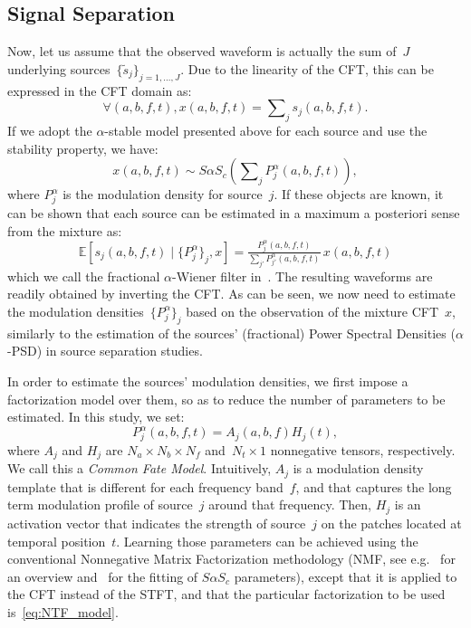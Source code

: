 \subsection{Signal Separation}

Now, let us assume that the observed waveform is actually the sum
of~$J$ underlying sources~$\{ \tilde{s}_{j}\} _{j=1,\dots,J}$.
Due to the linearity of the CFT, this can be
expressed in the CFT domain as:
$$
\forall\left(a,b,f,t\right),x\left(a,b,f,t\right)=\sum\nolimits_{j}s_{j}\left(a,b,f,t\right).
$$
If we adopt the $\alpha$-stable model presented above for each source
and use the stability property, we have:
$$
x\left(a,b,f,t\right)\sim S\alpha S_{c}\left(\sum\nolimits_{j}P_{j}^{\alpha}\left(a,b,f,t\right)\right),
$$
where $P_{j}^{\alpha}$ is the modulation density for source~$j$.
If these objects are known, it can be shown that each source can be
estimated in a maximum a posteriori sense from the mixture as:
\begin{equation}
\mathbb{E}\left[s_{j}\left(a,b,f,t\right)\mid \{ P_{j}^{\alpha}\} _{j},x\right]=\tfrac{P_{j}^{\alpha}\left(a,b,f,t\right)}{\sum_{j'}P_{j'}^{\alpha}\left(a,b,f,t\right)} \, x\left(a,b,f,t\right)\label{eq:alpha_wiener}
\end{equation}
which we call the fractional $\alpha$-Wiener filter in~\cite{alpha-wiener}.
The resulting waveforms are readily obtained by inverting the CFT.\@
As can be seen, we now need to estimate the modulation
densities~$\{ P_{j}^{\alpha}\} _{j}$ based on the observation
of the mixture CFT~$x$, similarly to the estimation of
 the sources' (fractional) Power Spectral Densities ($\alpha$-PSD)
in source separation studies.



\label{sub:NTF}

In order to estimate the sources' modulation densities, we first impose
a factorization model over them, so as to reduce the number of parameters
to be estimated. In this study, we set:
\begin{equation}
P_{j}^{\alpha}\left(a,b,f,t\right)=A_{j}\left(a,b,f\right)H_{j}\left(t\right),\label{eq:NTF_model}
\end{equation}
where $A_{j}$ and $H_{j}$ are $N_{a}\times N_{b}\times N_{f}$ and~$N_{t}\times1$
nonnegative tensors, respectively. We call this a \emph{Common Fate
Model}. Intuitively, $A_{j}$ is a modulation density template that
is different for each frequency band~$f$, and that captures the
long term modulation profile of source~$j$ around that frequency.
Then, $H_{j}$ is an activation vector that indicates the strength
of source~$j$ on the patches located at temporal position~$t$.
Learning those parameters can be achieved using the conventional Nonnegative
Matrix Factorization methodology (NMF, see e.g.~\cite{NMF-CICHOKI,ozerov2012general,sourceSepNMFReview2014}
for an overview and~\cite{liutkusNMF_FIM} for the fitting of $S\alpha S_{c}$
parameters), except that it is applied to the CFT instead of the STFT,
and that the particular factorization to be used is~\eqref{eq:NTF_model}.

